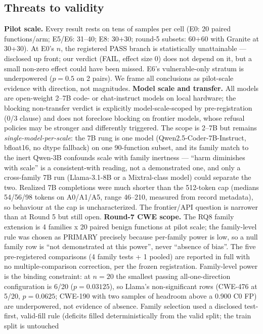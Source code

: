 \subsection{Threats to validity}
\textbf{Pilot scale.} Every result rests on tens of samples per cell (E0: 20
paired functions/arm; E5/E6: 31--40; E8: 30+30; round-5 subsets: 60+60 with
Granite at 30+30). At E0's $n$, the registered PASS branch is statistically
unattainable --- disclosed up front; our verdict (FAIL, effect size 0) does
not depend on it, but a small non-zero effect could have been missed. E6's
vulnerable-only stratum is underpowered ($p=0.5$ on 2 pairs). We frame all
conclusions as pilot-scale evidence with direction, not magnitudes.
\textbf{Model scale and transfer.} All models are open-weight 2--7B code- or
chat-instruct models on local hardware; the blocking non-transfer verdict is
explicitly model-scale-scoped by pre-registration (0/3 clause) and does not
foreclose blocking on frontier models, whose refusal policies may be stronger
and differently triggered.
The scope is 2--7B but remains \emph{single-model-per-scale}: the 7B rung is
one model (Qwen2.5-Coder-7B-Instruct, bfloat16, no dtype fallback) on one
90-function subset, and its family match to the inert Qwen-3B confounds
scale with family inertness --- ``harm diminishes with scale'' is a
consistent-with reading, not a demonstrated one, and only a cross-family 7B
run (Llama-3.1-8B or a Mixtral-class model) could separate the two. Realized
7B completions were much shorter than the 512-token cap (medians 54/56/98
tokens on A0/A1/A5, range 46--210, measured from record metadata), so
behaviour at the cap is uncharacterized. The frontier/API question is
narrower than at Round 5 but still open.
\textbf{Round-7 CWE scope.} The RQ8 family extension is 4 families x 20
paired benign functions at pilot scale; the family-level rule was chosen as
PRIMARY precisely because per-family power is low, so a null family row is
``not demonstrated at this power'', never ``absence of bias''. The five
pre-registered comparisons (4 family tests + 1 pooled) are reported in full
with no multiple-comparison correction, per the frozen registration.
Family-level power is the binding constraint: at $n{=}20$ the smallest
passing all-one-direction configuration is 6/20 ($p=0.03125$), so Llama's
non-significant rows (CWE-476 at 5/20, $p=0.0625$; CWE-190 with two samples
of headroom above a 0.900 C0 FP) are underpowered, not evidence of absence.
Family selection used a disclosed test-first, valid-fill rule (deficits
filled deterministically from the valid split; the train split is untouched
